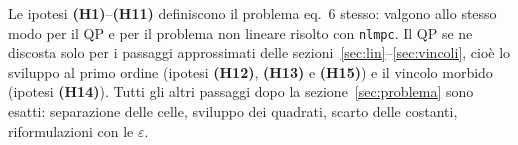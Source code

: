 \documentclass[11pt,a4paper]{article}
\newcommand{\ip}[1]{\textbf{(H#1)}}         %
\begin{document}
\noindent
Le ipotesi \ip{1}--\ip{11} definiscono il problema eq.~6 stesso: valgono
allo stesso modo per il QP e per il problema non lineare risolto con
\texttt{nlmpc}. Il QP se ne discosta solo per i passaggi approssimati delle
sezioni~\ref{sec:lin}--\ref{sec:vincoli}, cioè lo sviluppo al primo ordine
(ipotesi \ip{12}, \ip{13} e \ip{15}) e il vincolo morbido (ipotesi
\ip{14}). Tutti gli altri
passaggi dopo la sezione~\ref{sec:problema} sono esatti: separazione delle
celle, sviluppo dei quadrati, scarto delle costanti, riformulazioni con le
$\varepsilon$.
\end{document}
